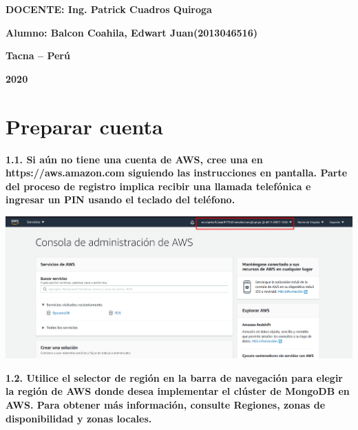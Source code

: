 \documentclass{article}
\begin{document}
\begin{titlepage}
\begin{center}
\vspace*{0.3in}
\begin{Large}
\textbf{DOCENTE: Ing. Patrick Cuadros Quiroga} \\
\end{Large}

\vspace*{0.2in}
\vspace*{0.1in}
\begin{large}

\begin{Large}
\textbf{Alumno: Balcon Coahila, Edwart Juan\hfill	(2013046516) } \\
\end{Large}

\vspace*{0.15in}
\begin{Large}
\textbf{Tacna – Perú} \\
\end{Large}

\vspace*{0.05in}
\begin{Large}
\textbf{2020 } \\
\end{Large}

\end{large}
\end{center}

\end{titlepage}


\newpage

\section{ Preparar cuenta}

\textbf{1.1. Si aún no tiene una cuenta de AWS, cree una en https://aws.amazon.com siguiendo las instrucciones en pantalla. Parte del proceso de registro implica recibir una llamada telefónica e ingresar un PIN usando el teclado del teléfono.}

    \begin{center}
		\includegraphics[width=15cm]{./images/1} 
	\end{center}
		\newpage
\textbf{1.2. 
Utilice el selector de región en la barra de navegación para elegir la región de AWS donde desea implementar el clúster de MongoDB en AWS. Para obtener más información, consulte Regiones, zonas de disponibilidad y zonas locales.}
\end{document}

